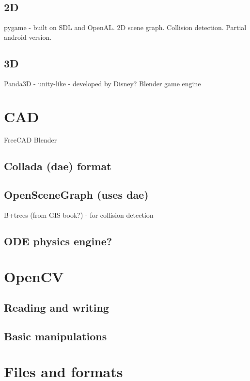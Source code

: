 \documentclass[oneside,english]{scrbook}
\begin{document}
\section{2D}
pygame - built on SDL and OpenAL.  2D scene graph. Collision detection. Partial android version.

\section{3D}
Panda3D - unity-like - developed by Disney?
Blender game engine

\chapter{CAD}
FreeCAD
Blender

\section{Collada (dae) format}


\section{OpenSceneGraph (uses dae)}
B+trees (from GIS book?) - for collision detection

\section{ODE physics engine?}

\chapter{OpenCV}


\section{Reading and writing}




\section{Basic manipulations}


\chapter{Files and formats}
\end{document}
